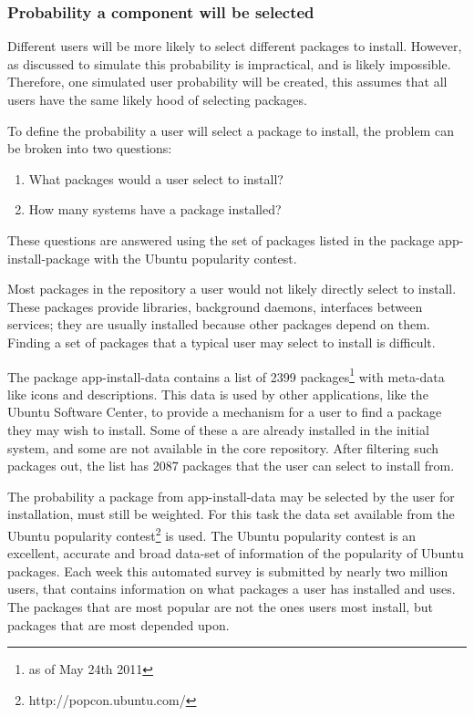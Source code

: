 \subsubsection{Probability a component will be selected}
Different users will be more likely to select different packages to install.
However, as discussed to simulate this probability is impractical, and is likely impossible.
Therefore, one simulated user probability will be created, this assumes that all users have the same likely hood of selecting packages.

To define the probability a user will select a package to install, the problem can be broken into two questions:
\begin{enumerate}
  \item What packages would a user select to install?
  \item How many systems have a package installed?
\end{enumerate}
These questions are answered using the set of packages listed in the package app-install-package with the Ubuntu popularity contest.

Most packages in the repository a user would not likely directly select to install.
These packages provide libraries, background daemons, interfaces between services; they are usually installed because other packages depend on them.
Finding a set of packages that a typical user may select to install is difficult.

The package app-install-data contains a list of 2399 packages\footnote{as of May 24th 2011} with meta-data like icons and descriptions.
This data is used by other applications, like the Ubuntu Software Center, to provide a mechanism for a user to find a package they may wish to install.
Some of these a are already installed in the initial system, and some are not available in the core repository.
After filtering such packages out, the list has 2087 packages that the user can select to install from. 

The probability a package from app-install-data may be selected by the user for installation, must still be weighted.
For this task the data set available from the Ubuntu popularity contest\footnote{http://popcon.ubuntu.com/} is used.
The Ubuntu popularity contest is an excellent, accurate and broad data-set of information of the popularity of Ubuntu packages.
Each week this automated survey is submitted by nearly two million users, that contains information on what packages a user has installed and uses.
The packages that are most popular are not the ones users most install, but packages that are most depended upon.

